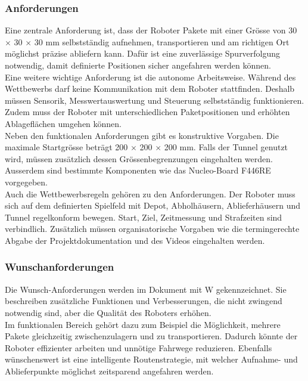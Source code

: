 \documentclass[11pt,a4paper]{article}
\begin{document}
	\subsubsection{Anforderungen}
	
		Eine zentrale Anforderung ist, dass der Roboter Pakete mit einer Grösse von 30 \(\times\) 30 \(\times\) 30 mm selbstständig aufnehmen, transportieren und am richtigen Ort möglichst präzise abliefern kann. Dafür ist eine zuverlässige Spurverfolgung notwendig, damit definierte Positionen sicher angefahren werden können.
		\\
		
		\noindent
		Eine weitere wichtige Anforderung ist die autonome Arbeitsweise. Während des Wettbewerbs darf keine Kommunikation mit dem Roboter stattfinden. Deshalb müssen Sensorik, Messwertauswertung und Steuerung selbstständig funktionieren. Zudem muss der Roboter mit unterschiedlichen Paketpositionen und erhöhten Ablageflächen umgehen können.
		\\
		
		\noindent
		Neben den funktionalen Anforderungen gibt es konstruktive Vorgaben. Die maximale Startgrösse beträgt 200 \(\times\) 200 \(\times\) 200 mm. Falls der Tunnel genutzt wird, müssen zusätzlich dessen Grössenbegrenzungen eingehalten werden. Ausserdem sind bestimmte Komponenten wie das Nucleo-Board F446RE vorgegeben.
		\\
		
		\noindent
		Auch die Wettbewerbsregeln gehören zu den Anforderungen. Der Roboter muss sich auf dem definierten Spielfeld mit Depot, Abholhäusern, Ablieferhäusern und Tunnel regelkonform bewegen. Start, Ziel, Zeitmessung und Strafzeiten sind verbindlich. Zusätzlich müssen organisatorische Vorgaben wie die termingerechte Abgabe der Projektdokumentation und des Videos eingehalten werden.
		
	\subsubsection{Wunschanforderungen}
		
		Die Wunsch-Anforderungen werden im Dokument mit W gekennzeichnet. Sie beschreiben zusätzliche Funktionen und Verbesserungen, die nicht zwingend notwendig sind, aber die Qualität des Roboters erhöhen.
		\\
		
		\noindent
		Im funktionalen Bereich gehört dazu zum Beispiel die Möglichkeit, mehrere Pakete gleichzeitig zwischenzulagern und zu transportieren. Dadurch könnte der Roboter effizienter arbeiten und unnötige Fahrwege reduzieren. Ebenfalls wünschenswert ist eine intelligente Routenstrategie, mit welcher Aufnahme- und Ablieferpunkte möglichst zeitsparend angefahren werden.
		\\
		
\end{document}
